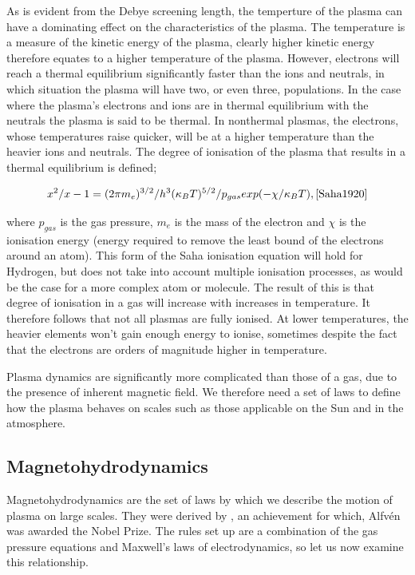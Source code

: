 As is evident from the Debye screening length, the temperture of the plasma can have a dominating effect on the characteristics of the plasma.
The temperature is a measure of the kinetic energy of the plasma, clearly higher kinetic energy therefore equates to a higher temperature of the plasma.
However, electrons will reach a thermal equilibrium significantly faster than the ions and neutrals, in which situation the plasma will have two, or even three, populations.
In the case where the plasma's electrons and ions are in thermal equilibrium with the neutrals the plasma is said to be thermal.
In nonthermal plasmas, the electrons, whose temperatures raise quicker, will be at a higher temperature than the heavier ions and neutrals.
The degree of ionisation of the plasma that results in a thermal equilibrium is defined;

\begin{equation}
	x^2/{x - 1} = (2\pi m_e)^{3/2}/h^3 (\kappa_BT)^{5/2}/p_{gas} exp(-{\chi/\kappa_BT}), \cite{Saha1920}
\end{equation}

where $p_{gas}$ is the gas pressure, $m_e$ is the mass of the electron and $\chi$ is the ionisation energy (energy required to remove the least bound of the electrons around an atom).
This form of the Saha ionisation equation will hold for Hydrogen, but does not take into account multiple ionisation processes, as would be the case for a more complex atom or molecule.
The result of this is that degree of ionisation in a gas will increase with increases in temperature.
It therefore follows that not all plasmas are fully ionised.
At lower temperatures, the heavier elements won't gain enough energy to ionise, sometimes despite the fact that the electrons are orders of magnitude higher in temperature.

Plasma dynamics are significantly more complicated than those of a gas, due to the presence of inherent magnetic field. 
We therefore need a set of laws to define how the plasma behaves on scales such as those applicable on the Sun and in the atmosphere.


\subsection{Magnetohydrodynamics}

Magnetohydrodynamics are the set of laws by which we describe the motion of plasma on large scales.
They were derived by \cite{Alfven1942}, an achievement for which, Alfv{\'e}n was awarded the Nobel Prize.
The rules set up are a combination of the gas pressure equations and Maxwell's laws of electrodynamics, so let us now examine this relationship.

